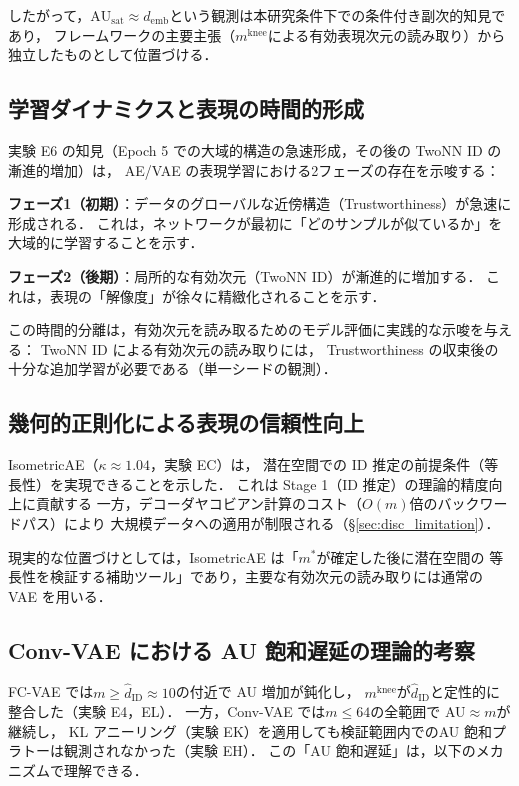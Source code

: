 \documentclass[11pt,a4paper]{jsarticle}
\newcommand{\dzopt}{m^*}
\newcommand{\kap}{\kappa}
\newcommand{\AUsat}{\mathrm{AU}_{\mathrm{sat}}}
\newcommand{\mknee}{m^{\mathrm{knee}}}
\newcommand{\demb}{d_{\mathrm{emb}}}
\begin{document}
したがって，$\AUsat \approx \demb$という観測は本研究条件下での条件付き副次的知見であり，
フレームワークの主要主張（$\mknee$による有効表現次元の読み取り）から独立したものとして位置づける．

\subsection{学習ダイナミクスと表現の時間的形成}\label{sec:disc_dynamics}

実験 E6 の知見（Epoch 5 での大域的構造の急速形成，その後の TwoNN ID の漸進的増加）は，
AE/VAE の表現学習における2フェーズの存在を示唆する：

\textbf{フェーズ1（初期）}：データのグローバルな近傍構造（Trustworthiness）が急速に形成される．
これは，ネットワークが最初に「どのサンプルが似ているか」を大域的に学習することを示す．

\textbf{フェーズ2（後期）}：局所的な有効次元（TwoNN ID）が漸進的に増加する．
これは，表現の「解像度」が徐々に精緻化されることを示す．

この時間的分離は，有効次元を読み取るためのモデル評価に実践的な示唆を与える：
TwoNN ID による有効次元の読み取りには，
Trustworthiness の収束後の十分な追加学習が必要である（単一シードの観測）．

\subsection{幾何的正則化による表現の信頼性向上}\label{sec:disc_isometric}

IsometricAE（$\kap \approx 1.04$，実験 EC）は，
潜在空間での ID 推定の前提条件（等長性）を実現できることを示した．
これは Stage 1（ID 推定）の理論的精度向上に貢献する
一方，デコーダヤコビアン計算のコスト（$O(m)$倍のバックワードパス）により
大規模データへの適用が制限される（§\ref{sec:disc_limitation}）．

現実的な位置づけとしては，IsometricAE は「$\dzopt$が確定した後に潜在空間の
等長性を検証する補助ツール」であり，主要な有効次元の読み取りには通常の VAE を用いる．

\subsection{Conv-VAE における AU 飽和遅延の理論的考察}\label{sec:disc_convvae}

FC-VAE では$m \geq \hat{d}_\mathrm{ID} \approx 10$の付近で AU 増加が鈍化し，
$\mknee$が$\hat{d}_\mathrm{ID}$と定性的に整合した（実験 E4，EL）．
一方，Conv-VAE では$m \leq 64$の全範囲で AU$\approx m$が継続し，
KL アニーリング（実験 EK）を適用しても検証範囲内でのAU 飽和プラトーは観測されなかった（実験 EH）．
この「AU 飽和遅延」は，以下のメカニズムで理解できる．
\end{document}
